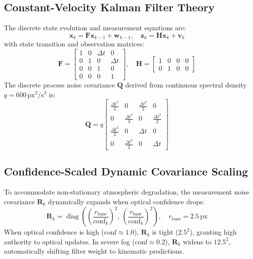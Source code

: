 \documentclass[11pt,a4paper]{article}
\begin{document}
\subsection{Constant-Velocity Kalman Filter Theory}
The discrete state evolution and measurement equations are:
\begin{equation}
    \mathbf{x}_{k} = \mathbf{F} \mathbf{x}_{k-1} + \mathbf{w}_{k-1}, \quad \mathbf{z}_k = \mathbf{H} \mathbf{x}_k + \mathbf{v}_k
\end{equation}
with state transition and observation matrices:
\begin{equation}
    \mathbf{F} = \begin{bmatrix} 1 & 0 & \Delta t & 0 \\ 0 & 1 & 0 & \Delta t \\ 0 & 0 & 1 & 0 \\ 0 & 0 & 0 & 1 \end{bmatrix}, \quad \mathbf{H} = \begin{bmatrix} 1 & 0 & 0 & 0 \\ 0 & 1 & 0 & 0 \end{bmatrix}
\end{equation}
The discrete process noise covariance $\mathbf{Q}$ derived from continuous spectral density $q = 600\,\text{px}^2/\text{s}^3$ is:
\begin{equation}
    \mathbf{Q} = q \begin{bmatrix} \frac{\Delta t^3}{3} & 0 & \frac{\Delta t^2}{2} & 0 \\ 0 & \frac{\Delta t^3}{3} & 0 & \frac{\Delta t^2}{2} \\ \frac{\Delta t^2}{2} & 0 & \Delta t & 0 \\ 0 & \frac{\Delta t^2}{2} & 0 & \Delta t \end{bmatrix}
\end{equation}

\subsection{Confidence-Scaled Dynamic Covariance Scaling}
To accommodate non-stationary atmospheric degradation, the measurement noise covariance $\mathbf{R}_k$ dynamically expands when optical confidence drops:
\begin{equation}
    \mathbf{R}_k = \operatorname{diag}\left( \left(\frac{r_{\text{base}}}{\text{conf}_k}\right)^2, \, \left(\frac{r_{\text{base}}}{\text{conf}_k}\right)^2 \right), \quad r_{\text{base}} = 2.5\,\text{px}
\end{equation}
When optical confidence is high ($\text{conf} \approx 1.0$), $\mathbf{R}_k$ is tight ($2.5^2$), granting high authority to optical updates. In severe fog ($\text{conf} \approx 0.2$), $\mathbf{R}_k$ widens to $12.5^2$, automatically shifting filter weight to kinematic predictions.
\end{document}
